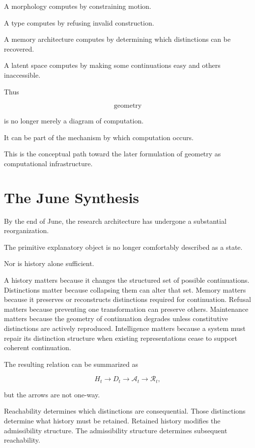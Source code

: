 \documentclass[11pt]{article}
\theoremstyle{remark}
\newcommand{\Adm}{\mathcal{A}}
\newcommand{\Reach}{\mathcal{R}}
\begin{document}
A morphology computes by constraining motion.

A type computes by refusing invalid construction.

A memory architecture computes by determining which distinctions can be recovered.

A latent space computes by making some continuations easy and others inaccessible.

Thus

\begin{equation}
\text{geometry}
\end{equation}

is no longer merely a diagram of computation.

It can be part of the mechanism by which computation occurs.

This is the conceptual path toward the later formulation of geometry as computational infrastructure.

\section{The June Synthesis}

By the end of June, the research architecture has undergone a substantial reorganization.

The primitive explanatory object is no longer comfortably described as a state.

Nor is history alone sufficient.

A history matters because it changes the structured set of possible continuations. Distinctions matter because collapsing them can alter that set. Memory matters because it preserves or reconstructs distinctions required for continuation. Refusal matters because preventing one transformation can preserve others. Maintenance matters because the geometry of continuation degrades unless constitutive distinctions are actively reproduced. Intelligence matters because a system must repair its distinction structure when existing representations cease to support coherent continuation.

The resulting relation can be summarized as

\begin{equation}
H_t
\longrightarrow
D_t
\longrightarrow
\Adm_t
\longrightarrow
\Reach_t,
\end{equation}

but the arrows are not one-way.

Reachability determines which distinctions are consequential. Those distinctions determine what history must be retained. Retained history modifies the admissibility structure. The admissibility structure determines subsequent reachability.
\end{document}
